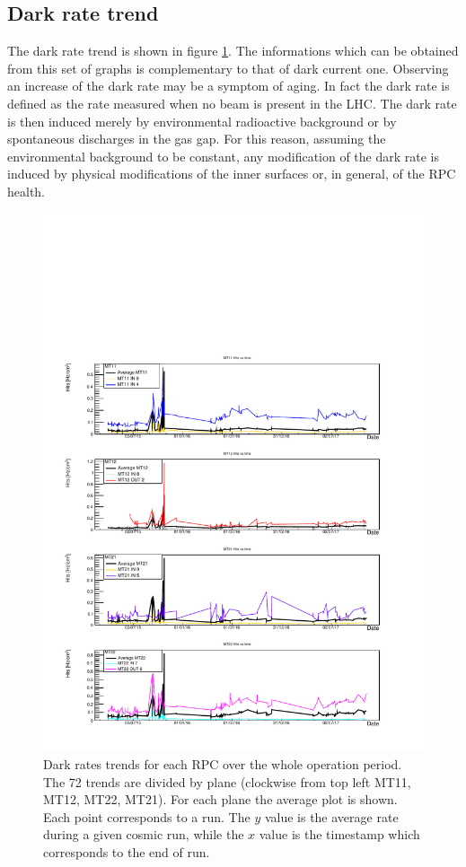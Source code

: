 \subsection{Dark rate trend}
The dark rate trend is shown in figure \ref{fig:DarkRate4Planes}.
The informations which can be obtained from this set of graphs is complementary to that of dark current one.
Observing an increase of the dark rate may be a symptom of aging.
In fact the dark rate is defined as the rate measured when no beam is present in the LHC.
The dark rate is then induced merely by environmental radioactive background or by spontaneous discharges in the gas gap.
For this reason, assuming the environmental background to be constant, any modification of the dark rate is induced by physical modifications of the inner surfaces or, in general, of the RPC health.

\begin{figure}[!t]
\begin{center}
\includegraphics[width=0.95\linewidth]{Chapters/Performance/Figs/DarkRate.pdf}
\caption{Dark rates trends for each RPC over the whole operation period. The 72 trends are divided by plane (clockwise from top left MT11, MT12, MT22, MT21). For each plane the average plot is shown. Each point corresponds to a run. The $y$ value is the average rate during a given cosmic run, while the $x$ value is the timestamp which corresponds to the end of run.}
\label{fig:DarkRate4Planes}
\end{center}
\end{figure}

